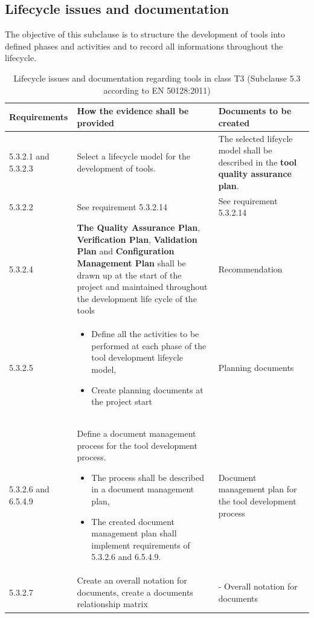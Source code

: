\documentclass{template/openetcs_report}
\begin{document}
\subsection{Lifecycle issues and documentation}
\label{SDLC}
\begin{flushleft}
The objective of this subclause is to structure the development of tools into defined phases and activities and to record all informations throughout the lifecycle.
\end{flushleft}
{\footnotesize\sffamily\centering
\begin{longtable}{|p{2cm}|p{9cm}|p{3cm}|}
\caption{Lifecycle issues and documentation regarding tools in class T3 (Subclause 5.3 according to EN 50128:2011)}\\
\hline
\bfseries Requirements & \bfseries How the evidence shall be provided & \bfseries Documents to be created\\
\hline
\hline
\endhead
\hline
\endfoot

5.3.2.1 and 5.3.2.3 & Select a lifecycle model for the development of tools.
& The selected lifeycle model shall be described in the \textbf{tool quality assurance plan}.\\ 
\hline
5.3.2.2 & See requirement 5.3.2.14 & See requirement 5.3.2.14\\ 
\hline
5.3.2.4 & \textbf{The Quality Assurance Plan}, \textbf{Verification Plan}, \textbf{Validation Plan} and \textbf{Configuration Management Plan} shall be drawn up at the start of the project and maintained throughout the development life cycle of the tools & Recommendation\\ 
\hline
5.3.2.5 & 
\begin{itemize}\itemsep=0pt
  \item Define all the activities to be performed at each phase of the tool development lifeycle model,
  \item Create planning documents at the project start
\end{itemize} 
& Planning documents\\ 
\hline
5.3.2.6 and 6.5.4.9 & Define a document management process for the tool development process.
\begin{itemize}\itemsep=0pt
  \item The process shall be described in a document management plan,
  \item The created document management plan shall implement requirements of 5.3.2.6 and 6.5.4.9.
\end{itemize}
& Document management plan for the tool development process\\ 
\hline
5.3.2.7 & Create an overall notation for documents, create a documents relationship matrix
& 
- Overall notation for documents 


\end{longtable}}
\end{document}
